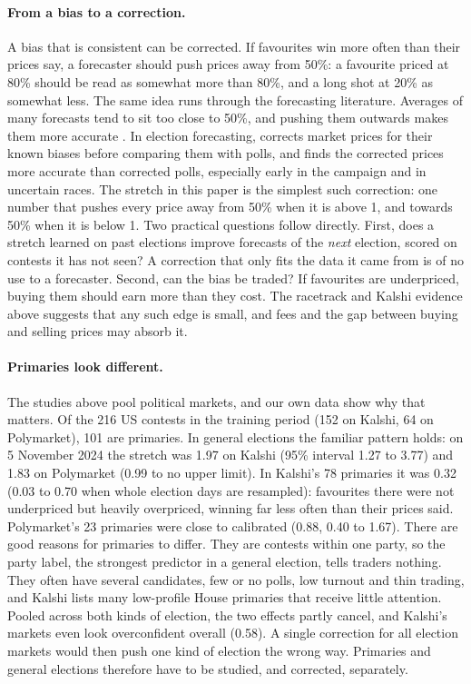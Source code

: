 \paragraph{From a bias to a correction.}
A bias that is consistent can be corrected. If favourites win more often than their prices say, a forecaster should
push prices away from 50\%: a favourite priced at 80\% should be read as somewhat more than 80\%, and a long shot at 20\%
as somewhat less. The same idea runs through the forecasting literature. Averages of many forecasts tend to sit too
close to 50\%, and pushing them outwards makes them more accurate \citep{baron2014}. In election forecasting,
\citet{rothschild2009} corrects market prices for their known biases before comparing them with polls, and finds the
corrected prices more accurate than corrected polls, especially early in the campaign and in uncertain races. The stretch in this paper is the simplest such correction: one number that
pushes every price away from 50\% when it is above 1, and towards 50\% when it is below 1. Two practical questions follow
directly. First, does a stretch learned on past elections improve forecasts of the \emph{next} election, scored on
contests it has not seen? A correction that only fits the data it came from is of no use to a forecaster. Second, can
the bias be traded? If favourites are underpriced, buying them should earn more than they cost. The racetrack and Kalshi
evidence above suggests that any such edge is small, and fees and the gap between buying and selling prices may absorb
it.

\paragraph{Primaries look different.}
The studies above pool political markets, and our own data show why that matters. Of the 216 US contests in the training
period (152 on Kalshi, 64 on Polymarket), 101 are primaries. In general elections the familiar pattern holds: on 5 November 2024 the stretch was 1.97 on
Kalshi (95\% interval 1.27 to 3.77) and 1.83 on Polymarket (0.99 to no upper limit). In Kalshi's 78 primaries it was
0.32 (0.03 to 0.70 when whole election days are resampled): favourites there were not underpriced but heavily
overpriced, winning far less often than their prices said. Polymarket's 23 primaries were close to calibrated (0.88,
0.40 to 1.67). There are good reasons for primaries to differ. They are contests within one party, so the party label,
the strongest predictor in a general election, tells traders nothing. They often have several candidates, few or no
polls, low turnout and thin trading, and Kalshi lists many low-profile House primaries that receive little attention.
Pooled across both kinds of election, the two effects partly cancel, and Kalshi's markets even look overconfident
overall (0.58). A single correction for all election markets would then push one kind of election the wrong way. Primaries and
general elections therefore have to be studied, and corrected, separately.

